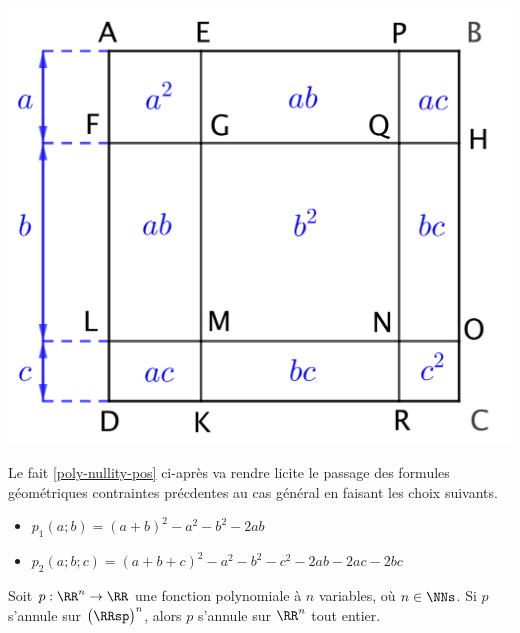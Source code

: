 \begin{center}
	\includegraphics[scale = .7]{(a+b)^3.png}
\end{center}

Le fait \ref{poly-nullity-pos} ci-après va rendre licite le passage des formules géométriques contraintes précdentes au cas général en faisant les choix suivants.
%
\begin{itemize}[label=\small\textbullet]
	\item $p_1(a ; b) = (a + b)^2 - a^2 - b^2 - 2 ab$

	\item $p_2(a ; b ; c) = (a + b + c)^2 - a^2 - b^2 - c^2 - 2 ab - 2 ac - 2 bc$
\end{itemize}




\begin{fact} \label{poly-nullity-pos}
	Soit $p: \RR^n \rightarrow \RR$ une fonction polynomiale à $n$ variables, où $n \in \NNs$.
	Si $p$ s'annule sur $\big( \RRsp \big)^n$, alors $p$ s'annule sur $\RR^n$ tout entier. 
\end{fact}


